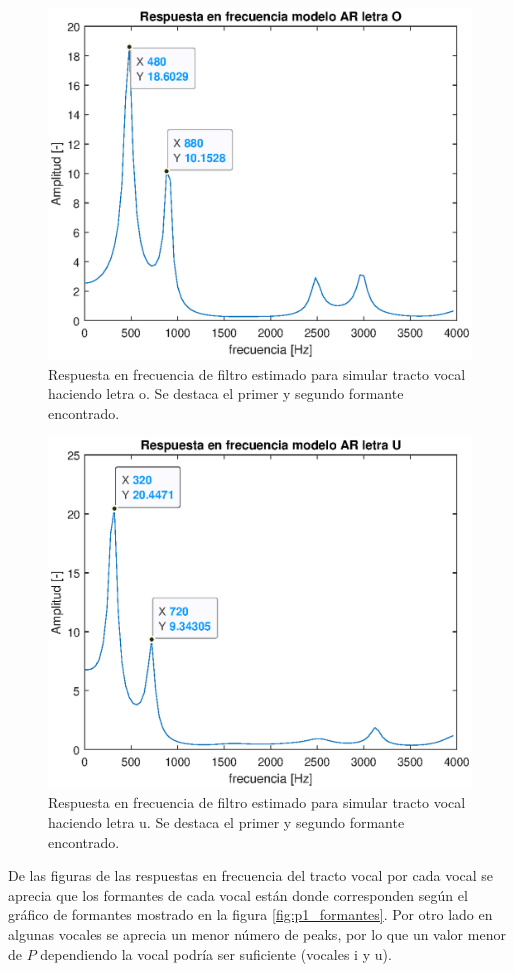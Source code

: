 \begin{figure}[H]
    \centering
    \includegraphics[width = .8\linewidth]{figures/p1_2o.eps}
    \caption{Respuesta en frecuencia de filtro estimado para simular tracto vocal haciendo letra o. Se destaca el primer y segundo formante encontrado.}
    \label{fig:p1_2o}
\end{figure}

\begin{figure}[H]
    \centering
    \includegraphics[width = .8\linewidth]{figures/p1_2u.eps}
    \caption{Respuesta en frecuencia de filtro estimado para simular tracto vocal haciendo letra u. Se destaca el primer y segundo formante encontrado.}
    \label{fig:p1_2u}
\end{figure}

De las figuras de las respuestas en frecuencia del tracto vocal por cada vocal se aprecia que los formantes de cada vocal están donde corresponden según el gráfico de formantes mostrado en la figura \ref{fig:p1_formantes}. Por otro lado en algunas vocales se aprecia un menor número de peaks, por lo que un valor menor de $P$ dependiendo la vocal podría ser suficiente (vocales i y u).

